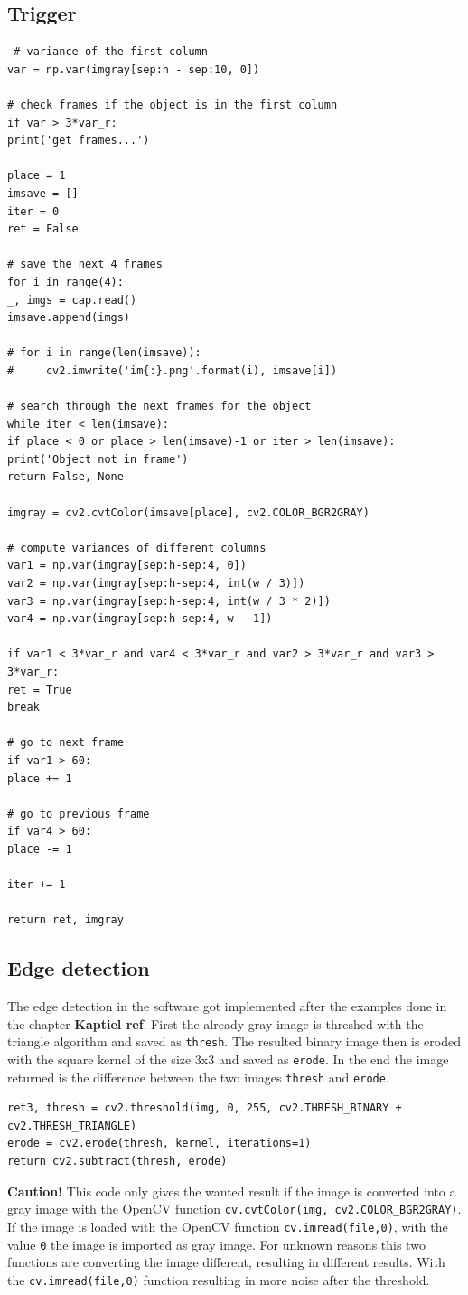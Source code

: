 \subsection{Trigger}

\begin{lstlisting}
 # variance of the first column
var = np.var(imgray[sep:h - sep:10, 0])

# check frames if the object is in the first column
if var > 3*var_r:
print('get frames...')

place = 1
imsave = []
iter = 0
ret = False

# save the next 4 frames
for i in range(4):
_, imgs = cap.read()
imsave.append(imgs)

# for i in range(len(imsave)):
#     cv2.imwrite('im{:}.png'.format(i), imsave[i])

# search through the next frames for the object
while iter < len(imsave):
if place < 0 or place > len(imsave)-1 or iter > len(imsave):
print('Object not in frame')
return False, None

imgray = cv2.cvtColor(imsave[place], cv2.COLOR_BGR2GRAY)

# compute variances of different columns
var1 = np.var(imgray[sep:h-sep:4, 0])
var2 = np.var(imgray[sep:h-sep:4, int(w / 3)])
var3 = np.var(imgray[sep:h-sep:4, int(w / 3 * 2)])
var4 = np.var(imgray[sep:h-sep:4, w - 1])

if var1 < 3*var_r and var4 < 3*var_r and var2 > 3*var_r and var3 > 3*var_r:
ret = True
break

# go to next frame
if var1 > 60:
place += 1

# go to previous frame
if var4 > 60:
place -= 1

iter += 1

return ret, imgray

\end{lstlisting} 
\subsection{Edge detection}
The edge detection in the software got implemented after the examples done in the chapter \textbf{Kaptiel ref}. First the already gray image is threshed with the triangle algorithm and saved as \texttt{thresh}. The resulted binary image then is eroded with the square kernel of the size 3x3 and saved as \texttt{erode}. In the end the image returned is the difference between the two images \texttt{thresh} and \texttt{erode}. 
\begin{lstlisting}
ret3, thresh = cv2.threshold(img, 0, 255, cv2.THRESH_BINARY + cv2.THRESH_TRIANGLE)
erode = cv2.erode(thresh, kernel, iterations=1)
return cv2.subtract(thresh, erode)
\end{lstlisting} 
\textbf{Caution!} This code only gives the wanted result if the image is converted into a gray image with the OpenCV function \texttt{cv.cvtColor(img, cv2.COLOR\_BGR2GRAY)}. If the image is loaded with the OpenCV function \texttt{cv.imread(file,0)}, with the value \texttt{0} the image is imported as gray image. For unknown reasons this two functions are converting the image different, resulting in different results. With the \texttt{cv.imread(file,0)} function resulting in more noise after the threshold.
 
